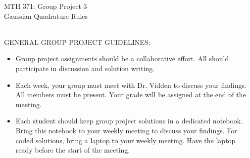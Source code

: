 \documentclass[addpoints, 11pt]{exam}
\begin{document}
\vspace{100mm}
\begin{center} \Large
MTH 371: Group Project 3 \\ Gaussian Quadrature Rules \normalsize
\end{center}
\ \\
\noindent GENERAL GROUP PROJECT GUIDELINES: 
\begin{itemize}
\item Group project assignments should be a collaborative effort. All should participate in discussion and solution writing. \vspace{-2mm}
\item Each week, your group must meet with Dr. Vidden to discuss your findings. All members must be present. Your grade will be assigned at the end of the meeting. \vspace{-2mm}
\item Each student should keep group project solutions in a dedicated notebook. Bring this notebook to your weekly meeting to discuss your findings. For coded solutions, bring a laptop to your weekly meeting. Have the laptop ready before the start of the meeting. \vspace{-2mm}
\end{itemize}
\ \\
\end{document}
